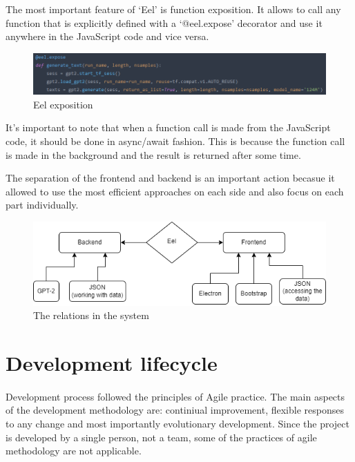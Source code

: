 \documentclass[12pt]{report}
\begin{document}
The most important feature of `Eel' is function exposition. It allows to call any function that is explicitly 
defined with a `@eel.expose' decorator and use it anywhere in the JavaScript code and vice versa.

\begin{figure}[ht]
  \centering
  \includegraphics[width=1\linewidth]{img/eel_expose_example.png}
  \caption{Eel exposition}
  \label{fig:eel}
\end{figure}

It's important to note that when a function call is made from the JavaScript code, it should be done in
async/await fashion. This is because the function call is made in the background and the result is returned
after some time.

The separation of the frontend and backend is an important action becasue it allowed to use the most efficient
approaches on each side and also focus on each part individually.

\begin{figure}[ht]
  \centering
  \includegraphics[width=1\linewidth]{img/system_diagram.png}
  \caption{The relations in the system}
  \label{fig:system_diagram}
\end{figure}

\clearpage

\section*{Development lifecycle}
\paragraph{}
Development process followed the principles of Agile practice. The main aspects of the development methodology
are: continiual improvement, flexible responses to any change and most importantly evolutionary development. Since
the project is developed by a single person, not a team, some of the practices of agile methodology are not applicable.
\end{document}
